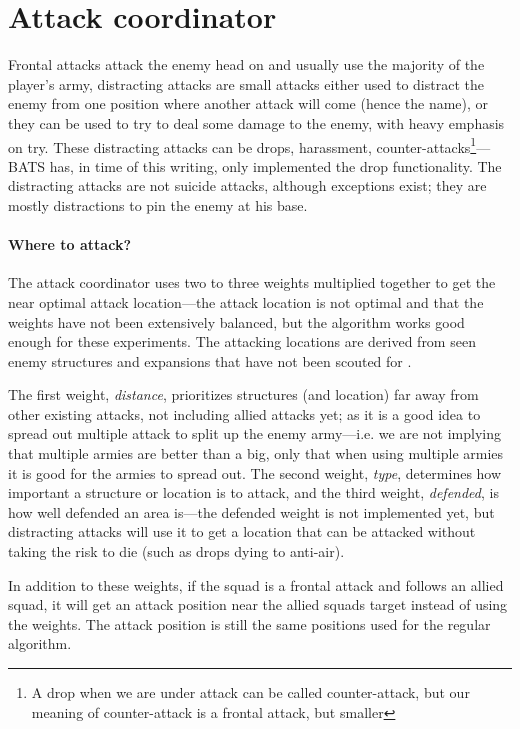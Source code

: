 \section{Attack coordinator}
\label{sec:attack_coordinator}
Frontal attacks attack the enemy head on and usually use the majority of the player’s army,
distracting attacks are small attacks either used to distract the enemy from one position where
another attack will come (hence the name), or they can be used to try to deal some damage to the
enemy, with heavy emphasis on try. These distracting attacks can be drops, harassment,
counter-attacks\footnote{A drop when we are under attack can be called counter-attack, but our
meaning of counter-attack is a frontal attack, but smaller}—BATS has, in time of this writing, only
implemented the drop functionality. The distracting attacks are not suicide attacks, although
exceptions exist; they are mostly distractions to pin the enemy at his base.

\paragraph{Where to attack?} The attack coordinator uses two to three weights multiplied together to
get the near optimal attack location—the attack location is not optimal and that the weights have
not been extensively balanced, but the algorithm works good enough for these experiments. The
attacking locations are derived from seen enemy structures and expansions that have not been scouted
for \attackCoordinatorExpansionNotCheckedTime.

The first weight, \emph{distance}, prioritizes structures (and location) far away from other
existing attacks, not including allied attacks yet; as it is a good idea to spread out multiple
attack to split up the enemy army—i.e. we are not implying that multiple armies are better than a
big, only that when using multiple armies it is good for the armies to spread out. The second
weight, \emph{type}, determines how important a structure or location is to attack, and the third
weight, \emph{defended}, is how well defended an area is—the defended weight is not implemented yet,
but distracting attacks will use it to get a location that can be attacked without taking the risk
to die (such as drops dying to anti-air).

In addition to these weights, if the squad is a frontal attack and follows an allied squad, it will
get an attack position near the allied squads target instead of using the weights. The attack
position is still the same positions used for the regular algorithm.

